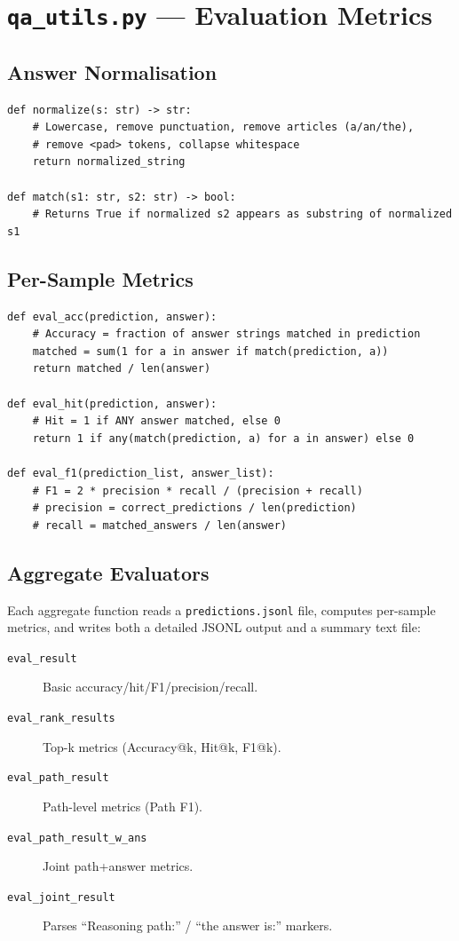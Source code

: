 \documentclass[11pt,a4paper,oneside,openany]{book}
\theoremstyle{definition}
\newcommand{\code}[1]{\texttt{#1}}
\begin{document}
\section{\texttt{qa\_utils.py} --- Evaluation Metrics}

\subsection{Answer Normalisation}

\begin{lstlisting}
def normalize(s: str) -> str:
    # Lowercase, remove punctuation, remove articles (a/an/the),
    # remove <pad> tokens, collapse whitespace
    return normalized_string

def match(s1: str, s2: str) -> bool:
    # Returns True if normalized s2 appears as substring of normalized s1
\end{lstlisting}

\subsection{Per-Sample Metrics}

\begin{lstlisting}
def eval_acc(prediction, answer):
    # Accuracy = fraction of answer strings matched in prediction
    matched = sum(1 for a in answer if match(prediction, a))
    return matched / len(answer)

def eval_hit(prediction, answer):
    # Hit = 1 if ANY answer matched, else 0
    return 1 if any(match(prediction, a) for a in answer) else 0

def eval_f1(prediction_list, answer_list):
    # F1 = 2 * precision * recall / (precision + recall)
    # precision = correct_predictions / len(prediction)
    # recall = matched_answers / len(answer)
\end{lstlisting}

\subsection{Aggregate Evaluators}

Each aggregate function reads a \code{predictions.jsonl} file, computes per-sample metrics, and writes both a detailed JSONL output and a summary text file:

\begin{description}
	\item[\texttt{eval\_result}] Basic accuracy/hit/F1/precision/recall.
	\item[\texttt{eval\_rank\_results}] Top-k metrics (Accuracy@k, Hit@k, F1@k).
	\item[\texttt{eval\_path\_result}] Path-level metrics (Path F1).
	\item[\texttt{eval\_path\_result\_w\_ans}] Joint path+answer metrics.
	\item[\texttt{eval\_joint\_result}] Parses ``Reasoning path:'' / ``the answer is:'' markers.
\end{description}
\end{document}
